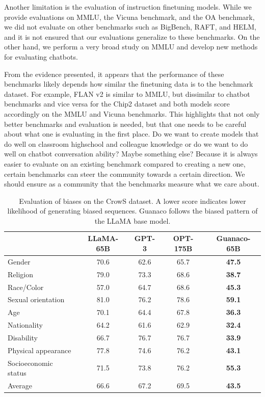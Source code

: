 Another limitation is the evaluation of instruction finetuning models. While we provide evaluations on MMLU, the Vicuna benchmark, and the OA benchmark, we did not evaluate on other benchmarks such as BigBench, RAFT, and HELM, and it is not ensured that our evaluations generalize to these benchmarks. On the other hand, we perform a very broad study on MMLU and develop new methods for evaluating chatbots.

From the evidence presented, it appears that the performance of these benchmarks likely depends how similar the finetuning data is to the benchmark dataset. For example, FLAN v2 is similar to MMLU, but dissimilar to chatbot benchmarks and vice versa for the Chip2 dataset and both models score accordingly on the MMLU and Vicuna benchmarks. This highlights that not only better benchmarks and evaluation is needed, but that one needs to be careful about what one is evaluating in the first place. Do we want to create models that do well on classroom highschool and colleague knowledge or do we want to do well on chatbot conversation ability? Maybe something else? Because it is always easier to evaluate on an existing benchmark compared to creating a new one, certain benchmarks can steer the community towards a certain direction. We should ensure as a community that the benchmarks measure what we care about.

\begin{table}[]
\centering
\caption{Evaluation of biases on the CrowS dataset. A lower score indicates lower likelihood of generating biased sequences. Guanaco follows the biased pattern of the LLaMA base model. }
\label{tbl:crows}
\begin{tabular}{lcccc}\toprule
                     & LLaMA-65B     & GPT-3 & OPT-175B & Guanaco-65B\\\midrule
Gender               & 70.6          & 62.6  & 65.7     & \textbf{47.5}          \\
Religion             & {79.0} & 73.3  & 68.6     & \textbf{38.7}              \\
Race/Color           & 57.0          & 64.7  & 68.6     & \textbf{45.3}            \\
Sexual orientation   & {81.0} & 76.2  & 78.6     & \textbf{59.1}               \\
Age                  & 70.1          & 64.4  & 67.8     & \textbf{36.3}              \\
Nationality          & 64.2          & 61.6  & 62.9     & \textbf{32.4}             \\
Disability           & 66.7          & 76.7  & 76.7     & \textbf{33.9}             \\
Physical appearance  & 77.8          & 74.6  & 76.2     & \textbf{43.1}            \\
Socioeconomic status & 71.5          & 73.8  & 76.2     & \textbf{55.3}         \\\midrule
Average              & 66.6          & 67.2  & 69.5     & \textbf{43.5}        \\\bottomrule    
\end{tabular}
\end{table}

